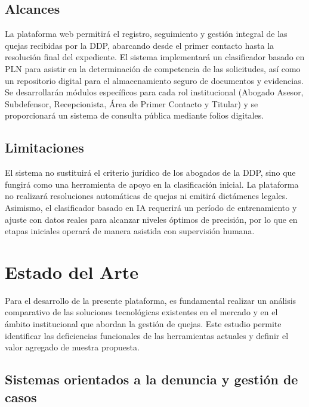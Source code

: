 \subsection{Alcances}
La plataforma web permitirá el registro, seguimiento y gestión integral de las quejas recibidas por la DDP, abarcando desde el primer contacto hasta la resolución final del expediente. El sistema implementará un clasificador basado en PLN para asistir en la determinación de competencia de las solicitudes, así como un repositorio digital para el almacenamiento seguro de documentos y evidencias. Se desarrollarán módulos específicos para cada rol institucional (Abogado Asesor, Subdefensor, Recepcionista, Área de Primer Contacto y Titular) y se proporcionará un sistema de consulta pública mediante folios digitales.

\subsection{Limitaciones}
El sistema no sustituirá el criterio jurídico de los abogados de la DDP, sino que fungirá como una herramienta de apoyo en la clasificación inicial. La plataforma no realizará resoluciones automáticas de quejas ni emitirá dictámenes legales. Asimismo, el clasificador basado en IA requerirá un período de entrenamiento y ajuste con datos reales para alcanzar niveles óptimos de precisión, por lo que en etapas iniciales operará de manera asistida con supervisión humana.

\section{Estado del Arte}
Para el desarrollo de la presente plataforma, es fundamental realizar un análisis comparativo de las soluciones tecnológicas existentes en el mercado y en el ámbito institucional que abordan la gestión de quejas. Este estudio permite identificar las deficiencias funcionales de las herramientas actuales y definir el valor agregado de nuestra propuesta.
\subsection{Sistemas orientados a la denuncia y gestión de casos}

